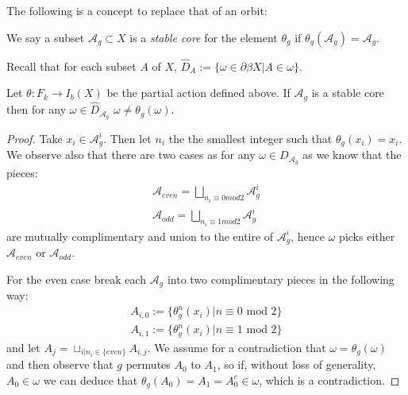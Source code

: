 The following is a concept to replace that of an orbit:
\begin{definition}
We say a subset $\mathcal{A}_{g} \subset X$ is a \textit{stable core} for the element $\theta_{g}$ if $\theta_{g}(\mathcal{A}_{g})=\mathcal{A}_{g}$. 
\end{definition}
Recall that for each subset $A$ of $X$, $\widehat{D}_{A}:=\lbrace \omega \in \partial \beta X | A \in \omega \rbrace$.

\begin{lemma}\label{Lem:StabCore}
Let $\theta: F_{k} \rightarrow I_{b}(X)$ be the partial action defined above. If $\mathcal{A}_{g}$ is a stable core then for any $\omega \in \widehat{D}_{\mathcal{A}_{g}}$ $\omega \not = \theta_{g}(\omega)$.
\end{lemma}
\begin{proof}
Take $x_{i}\in \mathcal{A}^{i}_{g}$. Then let $n_{i}$ the the smallest integer such that $\theta_{g}(x_{i})=x_{i}$. We observe also that there are two cases as for any $\omega \in D_{\mathcal{A}_{g}}$ as we know that the pieces: 
\begin{eqnarray*}
\mathcal{A}_{even}=\bigsqcup_{n_{i}\equiv 0 mod 2} \mathcal{A}_{g}^{i}\\
\mathcal{A}_{odd}=\bigsqcup_{n_{i} \equiv 1 mod 2} \mathcal{A}_{g}^{i}
\end{eqnarray*}
are mutually complimentary and union to the entire of $\mathcal{A}_{g}^{i}$, hence $\omega$ picks either $\mathcal{A}_{even}$ or $\mathcal{A}_{odd}$.

For the even case break each $\mathcal{A}_{g}$ into two complimentary pieces in the following way:
\begin{eqnarray*}
A_{i,0}:= \lbrace \theta_{g}^{n}(x_{i}) |n \equiv 0 \mbox{ mod } 2 \rbrace \\
A_{i,1}:= \lbrace \theta_{g}^{n}(x_{i}) |n \equiv 1 \mbox{ mod } 2 \rbrace
\end{eqnarray*}
and let $A_{j}=\sqcup_{i|n_{i} \in \lbrace even \rbrace}A_{i,j}$. We assume for a contradiction that $\omega=\theta_{g}(\omega)$ and then observe that $g$ permutes $A_{0}$ to $A_{1}$, so if, without loss of generality, $A_{0} \in \omega$ we can deduce that $\theta_{g}(A_{0})=A_{1}=A_{0}^{c}\in \omega$, which is a contradiction. 


\end{proof}
